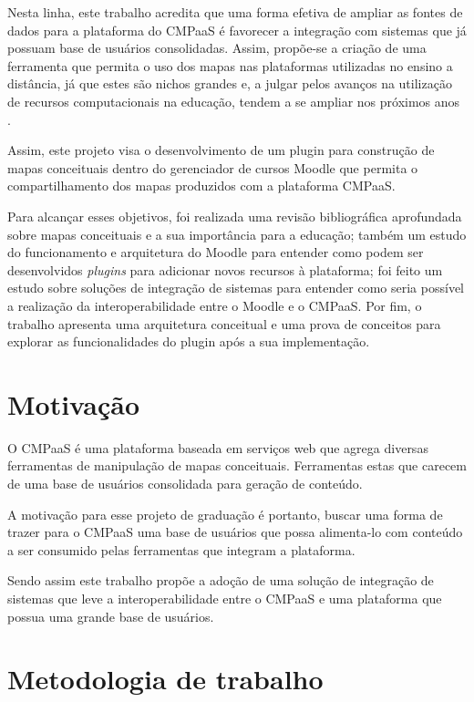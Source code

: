 \documentclass[
	12pt,				%
	openright,			%
	oneside,			%
	a4paper,			%
	english,			%
	french,				%
	spanish,			%
	brazil				%
	]{abntex2}
\begin{document}
Nesta linha, este trabalho acredita que uma forma efetiva de ampliar as fontes de dados para a plataforma do CMPaaS é favorecer a integração com sistemas que já possuam base de usuários consolidadas. Assim, propõe-se a criação de uma ferramenta que permita o uso dos mapas nas plataformas utilizadas no ensino a distância, já que estes são nichos grandes e, a julgar pelos avanços na utilização de recursos computacionais na educação, tendem a se ampliar nos próximos anos \cite{ribeiro2012}.

Assim, este projeto visa o desenvolvimento de um plugin para construção de mapas conceituais dentro do gerenciador de cursos Moodle que permita o compartilhamento dos mapas produzidos com a plataforma CMPaaS.

Para alcançar esses objetivos, foi realizada uma revisão bibliográfica aprofundada sobre mapas conceituais e a sua importância para a educação; também um  estudo do funcionamento e arquitetura do Moodle para entender como podem ser desenvolvidos \textit{plugins} para adicionar novos recursos à plataforma;  foi feito um estudo sobre soluções de integração de sistemas para entender como seria possível a realização da interoperabilidade entre o Moodle e o CMPaaS. Por fim, o trabalho apresenta uma arquitetura conceitual e uma prova de conceitos para explorar as funcionalidades do plugin após a sua implementação.

\section{Motivação} 
 
O CMPaaS é uma plataforma baseada em serviços web que agrega diversas ferramentas de manipulação de mapas conceituais. Ferramentas estas que carecem de uma base de usuários consolidada para geração de conteúdo.

A motivação para esse projeto de graduação é portanto, buscar uma forma de trazer para o CMPaaS uma base de usuários que possa alimenta-lo com conteúdo a ser consumido pelas ferramentas que integram a plataforma.

Sendo assim este trabalho propõe a adoção de uma solução de integração de sistemas que leve a interoperabilidade entre o CMPaaS e uma plataforma que possua uma grande base de usuários.

\section{Metodologia de trabalho}
\end{document}
